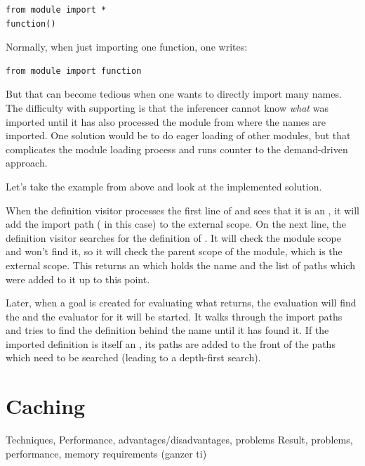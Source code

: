 \documentclass[12pt,halfparskip,DIV11,BCOR10mm]{scrreprt}
\begin{document}
\begin{lstlisting}
from module import *
function()
\end{lstlisting}

Normally, when just importing one function, one writes:

\begin{lstlisting}
from module import function
\end{lstlisting}

But that can become tedious when one wants to directly import many names. The difficulty with supporting  is that the inferencer cannot know \emph{what} was imported until it has also processed the module from where the names are imported. One solution would be to do eager loading of other modules, but that complicates the module loading process and runs counter to the demand-driven approach.

Let's take the example from above and look at the implemented solution.

When the definition visitor processes the first line of  and sees that it is an , it will add the import path ( in this case) to the external scope. On the next line, the definition visitor searches for the definition of . It will check the module scope and won't find it, so it will check the parent scope of the module, which is the external scope. This returns an  which holds the name and the list of  paths which were added to it up to this point.

Later, when a goal is created for evaluating what  returns, the evaluation will find the  and the evaluator for it will be started. It walks through the import paths and tries to find the definition behind the name  until it has found it. If the imported definition is itself an , its paths are added to the front of the paths which need to be searched (leading to a depth-first search).


\section{Caching}
 Techniques, Performance, advantages/disadvantages, problems
 Result, problems, performance, memory requirements (ganzer ti)
\end{document}

